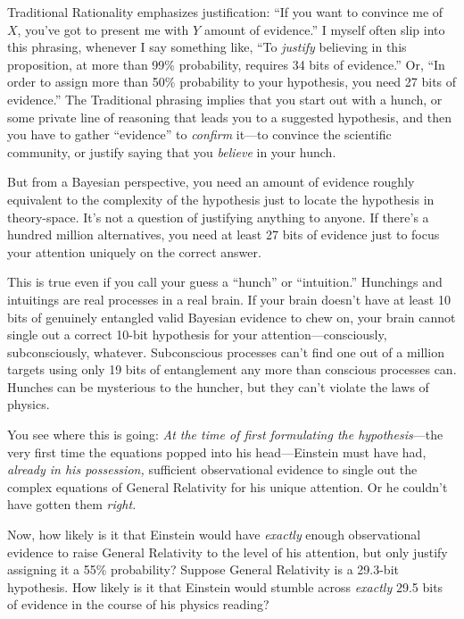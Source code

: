 {
 Traditional Rationality emphasizes justification:
``If you want to convince me of $X$,
you've got to present me with $Y$ amount of
evidence.'' I myself often slip into this phrasing,
whenever I say something like, ``To \textit{justify}
believing in this proposition, at more than 99\% probability, requires
34 bits of evidence.'' Or, ``In
order to assign more than 50\% probability to your hypothesis, you need
27 bits of evidence.'' The Traditional phrasing
implies that you start out with a hunch, or some private line of
reasoning that leads you to a suggested hypothesis, and then you have
to gather ``evidence'' to
\textit{confirm} it---to convince the scientific community, or justify
saying that you \textit{believe} in your hunch.}

{
 But from a Bayesian perspective, you need an amount of evidence
roughly equivalent to the complexity of the hypothesis just to locate
the hypothesis in theory-space. It's not a question of
justifying anything to anyone. If there's a hundred
million alternatives, you need at least 27 bits of evidence just to
focus your attention uniquely on the correct answer.}

{
 This is true even if you call your guess a
``hunch'' or
``intuition.'' Hunchings and
intuitings are real processes in a real brain. If your brain
doesn't have at least 10 bits of genuinely entangled
valid Bayesian evidence to chew on, your brain cannot single out a
correct 10-bit hypothesis for your attention---consciously,
subconsciously, whatever. Subconscious processes can't
find one out of a million targets using only 19 bits of entanglement
any more than conscious processes can. Hunches can be mysterious to the
huncher, but they can't violate the laws of physics.}

{
 You see where this is going: \textit{At the time of first
formulating the hypothesis}{}---the very first time the equations
popped into his head---Einstein must have had, \textit{already in his
possession,} sufficient observational evidence to single out the
complex equations of General Relativity for his unique attention. Or he
couldn't have gotten them \textit{right.}}

{
 Now, how likely is it that Einstein would have \textit{exactly}
enough observational evidence to raise General Relativity to the level
of his attention, but only justify assigning it a 55\% probability?
Suppose General Relativity is a 29.3-bit hypothesis. How likely is it
that Einstein would stumble across \textit{exactly} 29.5 bits of
evidence in the course of his physics reading?}

